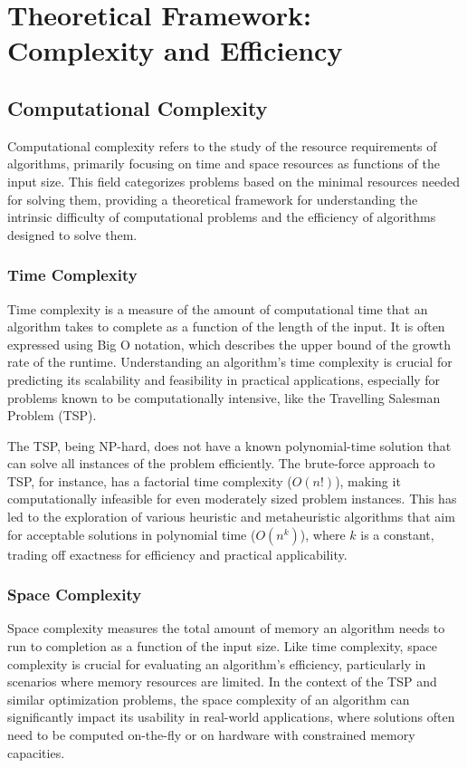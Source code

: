 \chapter{Theoretical Framework: Complexity and Efficiency}\label{chapt:2}

\section{Computational Complexity}

Computational complexity refers to the study of the resource requirements of algorithms, primarily focusing on time and space resources as functions of the input size. This field categorizes problems based on the minimal resources needed for solving them, providing a theoretical framework for understanding the intrinsic difficulty of computational problems and the efficiency of algorithms designed to solve them.

\subsection{Time Complexity}

Time complexity is a measure of the amount of computational time that an algorithm takes to complete as a function of the length of the input. It is often expressed using Big O notation, which describes the upper bound of the growth rate of the runtime. Understanding an algorithm's time complexity is crucial for predicting its scalability and feasibility in practical applications, especially for problems known to be computationally intensive, like the Travelling Salesman Problem (TSP).

The TSP, being NP-hard, does not have a known polynomial-time solution that can solve all instances of the problem efficiently. The brute-force approach to TSP, for instance, has a factorial time complexity (\(O(n!)\)), making it computationally infeasible for even moderately sized problem instances. This has led to the exploration of various heuristic and metaheuristic algorithms that aim for acceptable solutions in polynomial time (\(O(n^k)\)), where \(k\) is a constant, trading off exactness for efficiency and practical applicability.

\subsection{Space Complexity}

Space complexity measures the total amount of memory an algorithm needs to run to completion as a function of the input size. Like time complexity, space complexity is crucial for evaluating an algorithm's efficiency, particularly in scenarios where memory resources are limited. In the context of the TSP and similar optimization problems, the space complexity of an algorithm can significantly impact its usability in real-world applications, where solutions often need to be computed on-the-fly or on hardware with constrained memory capacities.

